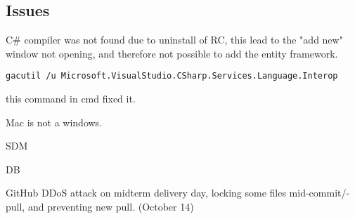 \subsection{Issues}
C\# compiler was not found due to uninstall of RC, this lead to the "add new" window not opening, and therefore not possible to add the entity framework.
\begin{verbatim}
gacutil /u Microsoft.VisualStudio.CSharp.Services.Language.Interop 
\end{verbatim} this command in cmd fixed it.

Mac is not a windows.

SDM

DB

GitHub DDoS attack on midterm delivery day, locking some files mid-commit/-pull, and preventing new pull. (October 14)